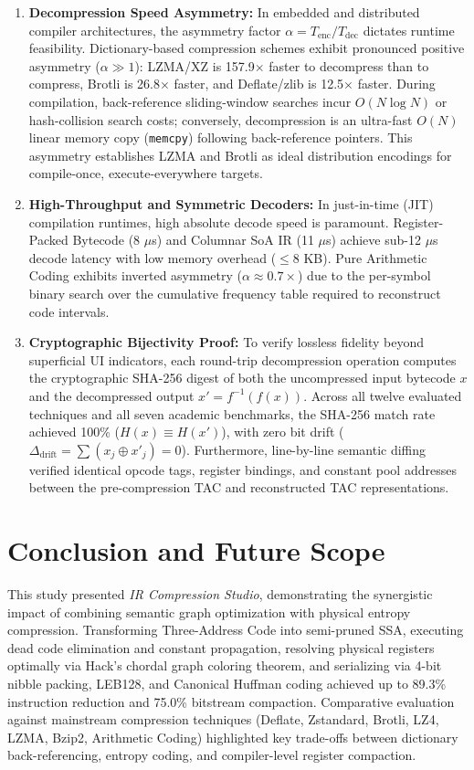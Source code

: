 \documentclass{ieeeaccess}
\begin{document}
\begin{enumerate}
    \item \textbf{Decompression Speed Asymmetry:} In embedded and distributed compiler architectures, the asymmetry factor $\alpha = T_{\text{enc}} / T_{\text{dec}}$ dictates runtime feasibility. Dictionary-based compression schemes exhibit pronounced positive asymmetry ($\alpha \gg 1$): LZMA/XZ is 157.9$\times$ faster to decompress than to compress, Brotli is 26.8$\times$ faster, and Deflate/zlib is 12.5$\times$ faster. During compilation, back-reference sliding-window searches incur $O(N \log N)$ or hash-collision search costs; conversely, decompression is an ultra-fast $O(N)$ linear memory copy (\texttt{memcpy}) following back-reference pointers. This asymmetry establishes LZMA and Brotli as ideal distribution encodings for compile-once, execute-everywhere targets.
    \item \textbf{High-Throughput and Symmetric Decoders:} In just-in-time (JIT) compilation runtimes, high absolute decode speed is paramount. Register-Packed Bytecode (8 $\mu$s) and Columnar SoA IR (11 $\mu$s) achieve sub-12 $\mu$s decode latency with low memory overhead ($\le 8$ KB). Pure Arithmetic Coding exhibits inverted asymmetry ($\alpha \approx 0.7\times$) due to the per-symbol binary search over the cumulative frequency table required to reconstruct code intervals.
    \item \textbf{Cryptographic Bijectivity Proof:} To verify lossless fidelity beyond superficial UI indicators, each round-trip decompression operation computes the cryptographic SHA-256 digest of both the uncompressed input bytecode $x$ and the decompressed output $x' = f^{-1}(f(x))$. Across all twelve evaluated techniques and all seven academic benchmarks, the SHA-256 match rate achieved 100\% ($H(x) \equiv H(x')$), with zero bit drift ($\Delta_{\text{drift}} = \sum (x_j \oplus x'_j) = 0$). Furthermore, line-by-line semantic diffing verified identical opcode tags, register bindings, and constant pool addresses between the pre-compression TAC and reconstructed TAC representations.
\end{enumerate}


\section{Conclusion and Future Scope}
\label{sec:conclusion} %
This study presented \textit{IR Compression Studio}, demonstrating the synergistic impact of combining semantic graph optimization with physical entropy compression. Transforming Three-Address Code into semi-pruned SSA, executing dead code elimination and constant propagation, resolving physical registers optimally via Hack's chordal graph coloring theorem, and serializing via 4-bit nibble packing, LEB128, and Canonical Huffman coding achieved up to 89.3\% instruction reduction and 75.0\% bitstream compaction. Comparative evaluation against mainstream compression techniques (Deflate, Zstandard, Brotli, LZ4, LZMA, Bzip2, Arithmetic Coding) highlighted key trade-offs between dictionary back-referencing, entropy coding, and compiler-level register compaction.
\end{document}
